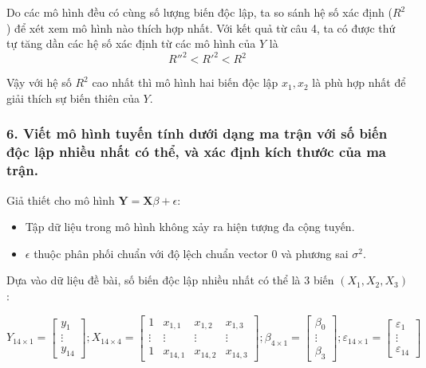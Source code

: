 \documentclass[a4paper]{article}
\theoremstyle{nonumberplain}
\begin{document}
Do các mô hình đều có cùng số lượng biến độc lập, ta so sánh hệ số xác định ($R^2$) để xét xem mô hình nào thích hợp nhất. Với kết quả từ câu 4, ta có được thứ tự tăng dần các hệ số xác định từ các mô hình của $Y$ là \[R''^2 < R'^2 < R^2 \]

Vậy với hệ số $R^2$ cao nhất thì mô hình hai biến độc lập $x_1, x_2$ là phù hợp nhất để giải thích sự biến thiên của $Y$.

\subsubsection*{6. Viết mô hình tuyến tính dưới dạng ma trận với số biến độc lập nhiều nhất có thể, và xác định kích thước của ma trận.}

Giả thiết cho mô hình $\mathbf{Y} = \mathbf{X}\beta + \epsilon$:
\begin{itemize}
	\item Tập dữ liệu trong mô hình không xảy ra hiện tượng đa cộng tuyến.
	\item $\epsilon$ thuộc phân phối chuẩn với độ lệch chuẩn vector $0$ và phương sai $\sigma^2$.
\end{itemize}

Dựa vào dữ liệu đề bài, số biến độc lập nhiều nhất có thể là 3 biến $(X_1,X_2,X_3)$:

\[{Y_{14 \times 1}} = \left[ {\begin{array}{*{20}{c}}
  {{y_1}} \\ 
   \vdots  \\ 
  {{y_{14}}} 
\end{array}} \right];{X_{14 \times 4}} = \left[ {\begin{array}{*{20}{c}}
  1&{{x_{1,1}}}&{{x_{1,2}}}&{{x_{1,3}}} \\ 
  \vdots & \vdots & \vdots & \vdots  \\ 
  1&{{x_{14,1}}}&{{x_{14,2}}}&{{x_{14,3}}} 
\end{array}} \right];{\beta _{4 \times 1}} = \left[ {\begin{array}{*{20}{c}}
  {{\beta _0}} \\ 
   \vdots  \\ 
  {{\beta _3}} 
\end{array}} \right];{\varepsilon _{14 \times 1}} = \left[ {\begin{array}{*{20}{c}}
  {{\varepsilon _1}} \\ 
   \vdots  \\ 
  {{\varepsilon _{14}}} 
\end{array}} \right]\]
\end{document}
